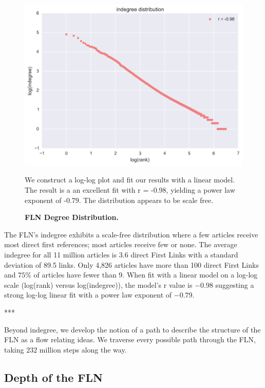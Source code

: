\documentclass[pre,twocolumn,twoside,superscriptaddress,floatfix, aps, 10pt]{revtex4-1}
\begin{document}
\begin{figure}[tp!]
  \centering	
  \includegraphics[width=\columnwidth]{graphics/ndegree_loglog.png}
  \caption{
    \textbf{FLN Degree Distribution.}
  }
  We construct a log-log plot and fit our results with a linear model. The result is a 
  an excellent fit with r = -0.98, yielding a power law exponent of -0.79. 
  The distribution appears to be scale free.
  \label{fig:degree distribution}
\end{figure}

The FLN's indegree exhibits a scale-free distribution where a few articles 
receive most direct first references; most articles receive few or none.
The average indegree for all 11 million articles is 3.6 direct First Links with a standard deviation of 89.5 links.
Only 4,826 articles have more than 100 direct First Links and $75\%$ of articles
have fewer than 9. 
When fit with a linear model on a log-log scale (log(rank) versus log(indegree)), 
the model's r value is $-0.98$ suggesting a strong log-log linear fit 
with a power law exponent of $-0.79$.\\

\centerline{***}

Beyond indegree, we develop the notion of a path to describe the structure of the FLN as a 
flow relating ideas. We traverse every possible path through the FLN, taking 
$232$ million steps along the way.


\subsection{Depth of the FLN}
\end{document}
